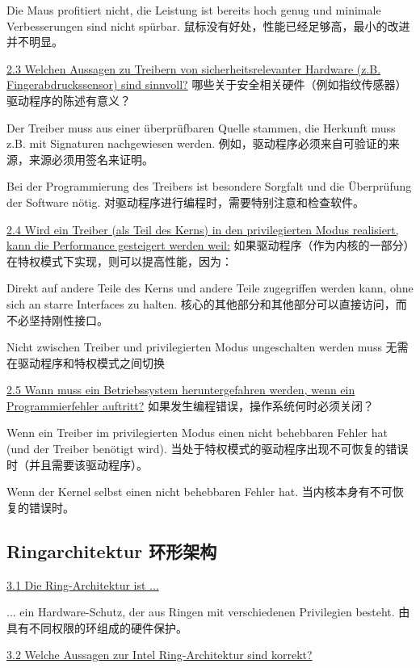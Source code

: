 \documentclass[fleqn]{article}
\begin{document}
Die Maus profitiert nicht, die Leistung ist bereits hoch genug und minimale Verbesserungen sind nicht spürbar.
鼠标没有好处，性能已经足够高，最小的改进并不明显。

\noindent\uline{2.3 Welchen Aussagen zu Treibern von sicherheitsrelevanter Hardware (z.B. Fingerabdruckssensor)  sind sinnvoll?}
哪些关于安全相关硬件（例如指纹传感器）驱动程序的陈述有意义？

Der Treiber muss aus einer überprüfbaren Quelle stammen, die Herkunft muss z.B. mit Signaturen nachgewiesen werden.
例如，驱动程序必须来自可验证的来源，来源必须用签名来证明。

Bei der Programmierung des Treibers ist besondere Sorgfalt und die Überprüfung der Software nötig.
对驱动程序进行编程时，需要特别注意和检查软件。

\noindent\uline{2.4 Wird ein Treiber (als Teil des Kerns) in den privilegierten Modus realisiert, kann die Performance gesteigert werden weil:}
如果驱动程序（作为内核的一部分）在特权模式下实现，则可以提高性能，因为：

Direkt auf andere Teile des Kerns und andere Teile zugegriffen werden kann, ohne sich an starre Interfaces zu halten.
核心的其他部分和其他部分可以直接访问，而不必坚持刚性接口。

Nicht zwischen Treiber und privilegierten Modus ungeschalten werden muss
无需在驱动程序和特权模式之间切换

\noindent\uline{2.5 Wann muss ein Betriebssystem heruntergefahren werden, wenn ein Programmierfehler auftritt?}
如果发生编程错误，操作系统何时必须关闭？

Wenn ein Treiber im privilegierten Modus einen nicht behebbaren Fehler hat (und der Treiber benötigt wird).
当处于特权模式的驱动程序出现不可恢复的错误时（并且需要该驱动程序）。

Wenn der Kernel selbst einen nicht behebbaren Fehler hat.
当内核本身有不可恢复的错误时。


\subsection{Ringarchitektur 环形架构}

\noindent\uline{3.1 Die Ring-Architektur ist ...}

... ein Hardware-Schutz, der aus Ringen mit verschiedenen Privilegien besteht.
由具有不同权限的环组成的硬件保护。

\noindent\uline{3.2 Welche Aussagen zur Intel Ring-Architektur sind korrekt?}
\end{document}
